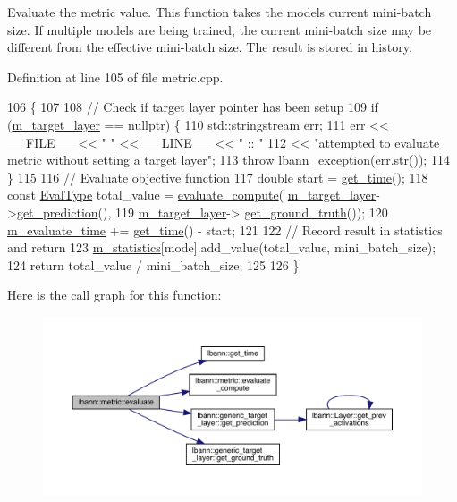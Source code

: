 Evaluate the metric value. This function takes the model\textquotesingle{}s current mini-\/batch size. If multiple models are being trained, the current mini-\/batch size may be different from the effective mini-\/batch size. The result is stored in history. 

Definition at line 105 of file metric.\+cpp.


\begin{DoxyCode}
106                                                \{
107 
108   \textcolor{comment}{// Check if target layer pointer has been setup}
109   \textcolor{keywordflow}{if} (\hyperlink{classlbann_1_1metric_a2bf6c53efb1b525bfa63a8c3167968d9}{m\_target\_layer} == \textcolor{keyword}{nullptr}) \{
110     std::stringstream err;
111     err << \_\_FILE\_\_ << \textcolor{stringliteral}{" "} << \_\_LINE\_\_ << \textcolor{stringliteral}{" :: "}
112         << \textcolor{stringliteral}{"attempted to evaluate metric without setting a target layer"};
113     \textcolor{keywordflow}{throw} lbann\_exception(err.str());
114   \}
115 
116   \textcolor{comment}{// Evaluate objective function}
117   \textcolor{keywordtype}{double} start = \hyperlink{namespacelbann_a478d36031ff0659893c4322cd856157f}{get\_time}();
118   \textcolor{keyword}{const} \hyperlink{base_8hpp_a3266f5ac18504bbadea983c109566867}{EvalType} total\_value = \hyperlink{classlbann_1_1metric_aab79147ff480675db2e01d7a889a4296}{evaluate\_compute}(
      \hyperlink{classlbann_1_1metric_a2bf6c53efb1b525bfa63a8c3167968d9}{m\_target\_layer}->\hyperlink{classlbann_1_1generic__target__layer_ac0b88a705256ab06bbba6bbffbc7ebc1}{get\_prediction}(),
119                                                 \hyperlink{classlbann_1_1metric_a2bf6c53efb1b525bfa63a8c3167968d9}{m\_target\_layer}->
      \hyperlink{classlbann_1_1generic__target__layer_a9cbe476f3e447bc91e2834921ca7da9f}{get\_ground\_truth}());
120   \hyperlink{classlbann_1_1metric_a4c77a1bd1db77e9d837a72128e3d687f}{m\_evaluate\_time} += \hyperlink{namespacelbann_a478d36031ff0659893c4322cd856157f}{get\_time}() - start;
121 
122   \textcolor{comment}{// Record result in statistics and return}
123   \hyperlink{classlbann_1_1metric_a9949d8aceedbc113aa2c356046ed73fc}{m\_statistics}[mode].add\_value(total\_value, mini\_batch\_size);
124   \textcolor{keywordflow}{return} total\_value / mini\_batch\_size;
125 
126 \}
\end{DoxyCode}
Here is the call graph for this function\+:\nopagebreak
\begin{figure}[H]
\begin{center}
\leavevmode
\includegraphics[width=350pt]{classlbann_1_1metric_ab4e14cb4296c7b47719071b210448dec_cgraph}
\end{center}
\end{figure}
